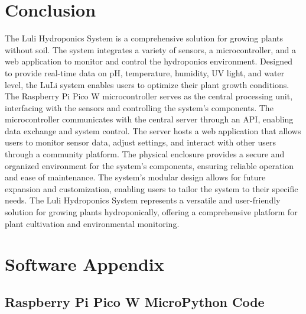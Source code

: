 \documentclass[12pt]{article} %
\begin{document}
\section{Conclusion}
\noindent The Luli Hydroponics System is a comprehensive solution for growing plants without soil. The system integrates a variety of sensors, a microcontroller, and a web application to monitor and control the hydroponics environment. Designed to provide real-time data on pH, temperature, humidity, UV light, and water level, the LuLi system enables users to optimize their plant growth conditions. The Raspberry Pi Pico W microcontroller serves as the central processing unit, interfacing with the sensors and controlling the system's components. The microcontroller communicates with the central server through an API, enabling data exchange and system control. The server hosts a web application that allows users to monitor sensor data, adjust settings, and interact with other users through a community platform. The physical enclosure provides a secure and organized environment for the system's components, ensuring reliable operation and ease of maintenance. The system's modular design allows for future expansion and customization, enabling users to tailor the system to their specific needs. The Luli Hydroponics System represents a versatile and user-friendly solution for growing plants hydroponically, offering a comprehensive platform for plant cultivation and environmental monitoring.

\appendix
\pagebreak
\section{Software Appendix}
\subsection{Raspberry Pi Pico W MicroPython Code}
\end{document}
